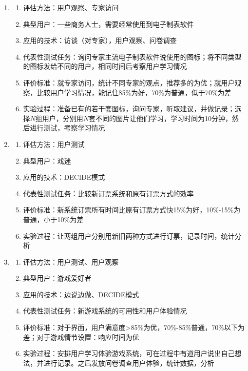 \begin{solution}
\begin{enumerate}[label=\alph*.]
    \item 
    \begin{enumerate}[label=\arabic*.]
        \item 评估方法：用户观察、专家访问
        \item 典型用户：一些商务人士，需要经常使用到电子制表软件
        \item 应用的技术：访谈（对专家），用户观察、问卷调查
        \item 代表性测试任务：询问专家主流电子制表软件说使用的图标；将不同类型的图标发给不同的用户，相同时间后考察用户学习情况
        \item 评价标准：就专家访问，统计不同专家的观点，推荐多的为优；就用户观察，比较用户学习情况，能记住85\%为好，70\%为普通，低于70\%为差
        \item 实验过程：准备已有的若干套图标，询问专家，听取建议，并做记录；选择$N$组用户，分别用$N$套不同的图片让他们学习，学习时间为10分钟，然后进行测试，考察学习情况
    \end{enumerate}
    \item 
    \begin{enumerate}[label=\arabic*.]
        \item 评估方法：用户测试
        \item 典型用户：戏迷
        \item 应用的技术：DECIDE模式
        \item 代表性测试任务：比较新订票系统和原有订票方式的效率
        \item 评价标准：新系统订票所有时间比原有订票方式快15\%为好，10\%-15\%为普通，小于10\%为差
        \item 实验过程：让两组用户分别用新旧两种方式进行订票，记录时间，统计分析
    \end{enumerate}
    \item 
    \begin{enumerate}[label=\arabic*.]
        \item 评估方法：用户测试、用户观察
        \item 典型用户：游戏爱好者
        \item 应用的技术：边说边做、DECIDE模式
        \item 代表性测试任务：新游戏系统的可用性和用户体验情况
        \item 评价标准：对于界面，用户满意度>85\%为优，70\%-85\%普通，70\%以下为差；对于游戏情节设置：响应时间为优
        \item 实验过程：安排用户学习体验游戏系统，可在过程中有道用户说出自己想法，并进行记录。之后发放问卷调查用户体验，统计数据，分析

\end{enumerate}
\end{enumerate}
\end{solution}

